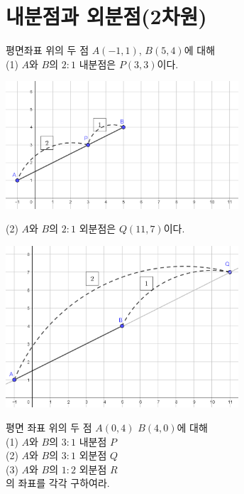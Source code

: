 \documentclass{oblivoir}
\begin{document}
\section{내분점과 외분점(2차원)}
%
\exam{}\label{intt01}
평면좌표 위의 두 점 \(A(-1,1)\), \(B(5,4)\)에 대해\\
(1) \(A\)와 \(B\)의 \(2:1\) 내분점은 \(P(3,3)\)이다.\par
\begin{center}
\includegraphics[width=0.65\textwidth]{intt_01}
\end{center}
(2) \(A\)와 \(B\)의 \(2:1\) 외분점은 \(Q(11,7)\)이다.
\begin{center}
\includegraphics[width=0.65\textwidth]{intt_02}
\end{center}

%
\prob{}\label{intt03}
평면 좌표 위의 두 점 \(A(0,4)\) \(B(4,0)\)에 대해\\
(1) \(A\)와 \(B\)의 \(3:1\) 내분점 \(P\)\\
(2) \(A\)와 \(B\)의  \(3:1\) 외분점 \(Q\)\\
(3) \(A\)와 \(B\)의 \(1:2\) 외분점 \(R\)\\
의 좌표를 각각 구하여라.
\end{document}
